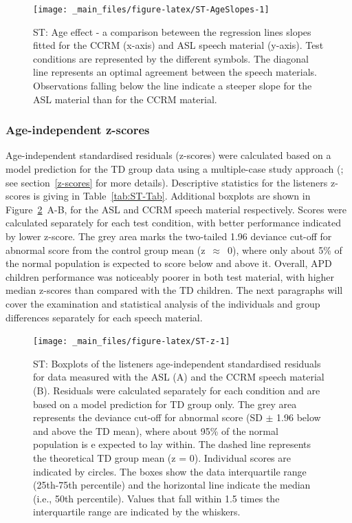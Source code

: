 \documentclass[a4paper, twoside]{templates/ociamthesis}
\begin{document}
\begin{figure}

{\centering \texttt{[image: \_main\_files/figure-latex/ST-AgeSlopes-1]} 

}

\caption{ST: Age effect - a comparison beteween the regression lines slopes fitted for the CCRM (x-axis) and ASL speech material (y-axis). Test conditions are represented by the different symbols. The diagonal line represents an optimal agreement between the speech materials. Observations falling below the line indicate a steeper slope for the ASL material than for the CCRM material.}\label{fig:ST-AgeSlopes}
\end{figure}

\hypertarget{age-independent-z-scores}{%
\subsubsection*{Age-independent z-scores}\label{age-independent-z-scores}}

Age-independent standardised residuals (z-scores) were calculated based on a model prediction for the TD group data using a multiple-case study approach (\textcite{Ramus2003}; see section~\ref{z-scores} for more details). Descriptive statistics for the listeners z-scores is giving in Table~\ref{tab:ST-Tab}. Additional boxplots are shown in Figure~\ref{fig:ST-z}~A-B, for the ASL and CCRM speech material respectively. Scores were calculated separately for each test condition, with better performance indicated by lower z-score. The grey area marks the two-tailed 1.96 deviance cut-off for abnormal score from the control group mean (z~\(\approx\)~0), where only about 5\% of the normal population is expected to score below and above it. Overall, APD children performance was noticeably poorer in both test material, with higher median z-scores than compared with the TD children. The next paragraphs will cover the examination and statistical analysis of the individuals and group differences separately for each speech material.\\

\begin{figure}

{\centering \texttt{[image: \_main\_files/figure-latex/ST-z-1]} 

}

\caption{ST: Boxplots of the listeners age-independent standardised residuals for data measured with the ASL (A) and the CCRM speech material (B). Residuals were calculated separately for each condition and are based on a model prediction for TD group only. The grey area represents the deviance cut-off for abnormal score (SD $\pm$ 1.96 below and above the TD mean), where about 95\% of the normal population is e expected to lay within. The dashed line represents the theoretical TD group mean (z = 0). Individual scores are indicated by circles. The boxes show the data interquartile range (25th-75th percentile) and the horizontal line indicate the median (i.e., 50th percentile). Values that fall within 1.5 times the interquartile range are indicated by the whiskers.}\label{fig:ST-z}
\end{figure}
\end{document}
